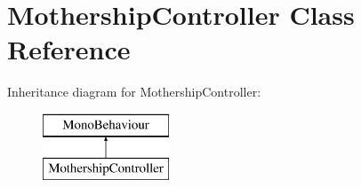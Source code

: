 \hypertarget{class_mothership_controller}{}\section{Mothership\+Controller Class Reference}
\label{class_mothership_controller}
Inheritance diagram for Mothership\+Controller\+:\begin{figure}[H]
\begin{center}
\leavevmode
\includegraphics[height=2.000000cm]{class_mothership_controller}
\end{center}
\end{figure}
